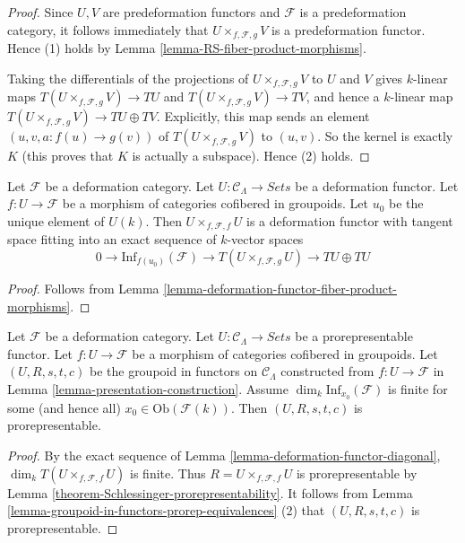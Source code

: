\begin{proof}
Since $U,V$ are predeformation functors and $\mathcal{F}$ is a predeformation 
category, it follows immediately that $U \times_{f, \mathcal{F}, g} V$ is a 
predeformation functor.  Hence (1) holds by Lemma 
\ref{lemma-RS-fiber-product-morphisms}.

\medskip \noindent
Taking the differentials of the projections of $U \times_{f, \mathcal{F}, g} V$ 
to $U$ and $V$ gives $k$-linear maps $T(U \times_{f, \mathcal{F}, g} V) 
\to TU$ and $T(U \times_{f, \mathcal{F}, g} V) \to TV$, and 
hence a $k$-linear map $T(U \times_{f, \mathcal{F}, g} V) \to TU \oplus 
TV$.  Explicitly, this map sends an element $(u,v,a: f(u) \to g(v))$ of 
$T(U \times_{f, \mathcal{F}, g} V)$ to $(u,v)$.  So the kernel is exactly $K$ 
(this proves that $K$ is actually a subspace). Hence (2) holds.
\end{proof}

\begin{lemma}
\label{lemma-deformation-functor-diagonal}
Let $\mathcal{F}$ be a deformation category.  Let $U: \mathcal{C}_\Lambda 
\to \textit{Sets}$ be a deformation functor.  Let $f: U 
\to \mathcal{F}$ be a morphism of categories cofibered in groupoids. Let 
$u_0$ be the unique element of $U(k)$.  Then $U \times_{f,\mathcal{F},f} U$ is
a deformation functor with tangent space fitting into an exact sequence of 
$k$-vector spaces
\[ 
0 \to \text{Inf}_{f(u_0)}(\mathcal{F}) \to T(U \times_{f, 
\mathcal{F}, g} U) \to TU \oplus TU 
\]
\end{lemma}

\begin{proof}
Follows from Lemma \ref{lemma-deformation-functor-fiber-product-morphisms}.
\end{proof}

\begin{lemma}
\label{lemma-prorepresentable-groupoid-in-functors-construction}
Let $\mathcal{F}$ be a deformation category.  Let $U: \mathcal{C}_\Lambda 
\to \textit{Sets}$ be a prorepresentable functor.  Let $f: U 
\to \mathcal{F}$ be a morphism of categories cofibered in groupoids.  
Let $(U,R,s,t,c)$ be the groupoid in functors on $\mathcal{C}_\Lambda$ 
constructed from $f: U \to \mathcal{F}$ in Lemma 
\ref{lemma-presentation-construction}. Assume $\dim_{k} 
\text{Inf}_{x_0}(\mathcal{F})$ is finite for some (and hence all) $x_0 \in 
\text{Ob}(\mathcal{F}(k))$.  Then  $(U,R,s,t,c)$ is prorepresentable.
\end{lemma}

\begin{proof}
By the exact sequence of Lemma \ref{lemma-deformation-functor-diagonal}, 
$\dim_{k} T(U \times_{f,\mathcal{F},f} U)$ is finite.  Thus $R =U 
\times_{f,\mathcal{F},f} U$ is prorepresentable by Lemma 
\ref{theorem-Schlessinger-prorepresentability}. It follows from Lemma 
\ref{lemma-groupoid-in-functors-prorep-equivalences} (2) that $(U,R,s,t,c)$ is 
prorepresentable.
\end{proof}

